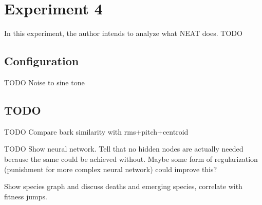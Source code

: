 \section{Experiment 4}
In this experiment, the author intends to analyze what NEAT does. TODO

\subsection{Configuration}
TODO Noise to sine tone

\subsection{TODO}
TODO Compare bark similarity with rms+pitch+centroid

TODO Show neural network. Tell that no hidden nodes are actually needed because the same could be achieved without. Maybe some form of regularization (punishment for more complex neural network) could improve this?

Show species graph and discuss deaths and emerging species, correlate with fitness jumps.